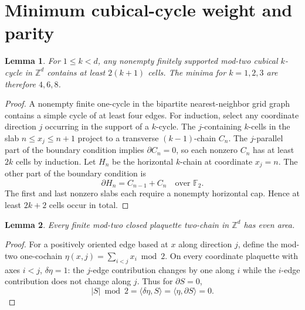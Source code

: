 \documentclass[11pt,a4paper]{article}
\newtheorem{lemma}{Lemma}
\begin{document}
\section{Minimum cubical-cycle weight and parity}
\begin{lemma}\label{lem:min}
For \(1\le k<d\), any nonempty finitely supported mod-two cubical \(k\)-cycle in \(\mathbb Z^d\) contains at least \(2(k+1)\) cells. The minima for \(k=1,2,3\) are therefore \(4,6,8\).
\end{lemma}
\begin{proof}
A nonempty finite one-cycle in the bipartite nearest-neighbor grid graph contains a simple cycle of at least four edges. For induction, select any coordinate direction \(j\) occurring in the support of a \(k\)-cycle. The \(j\)-containing \(k\)-cells in the slab \(n\le x_j\le n+1\) project to a transverse \((k-1)\)-chain \(C_n\). The \(j\)-parallel part of the boundary condition implies \(\partial C_n=0\), so each nonzero \(C_n\) has at least \(2k\) cells by induction. Let \(H_n\) be the horizontal \(k\)-chain at coordinate \(x_j=n\). The other part of the boundary condition is
\[
\partial H_n=C_{n-1}+C_n\quad\text{over }\mathbb F_2.
\]
The first and last nonzero slabs each require a nonempty horizontal cap. Hence at least \(2k+2\) cells occur in total.
\end{proof}
\begin{lemma}\label{lem:even}
Every finite mod-two closed plaquette two-chain in \(\mathbb Z^d\) has even area.
\end{lemma}
\begin{proof}
For a positively oriented edge based at \(x\) along direction \(j\), define the mod-two one-cochain
\(\eta(x,j)=\sum_{i<j}x_i\bmod2\).
On every coordinate plaquette with axes \(i<j\), \(\delta\eta=1\): the \(j\)-edge contribution changes by one along \(i\) while the \(i\)-edge contribution does not change along \(j\). Thus for \(\partial S=0\),
\[
|S|\bmod2=\langle\delta\eta,S\rangle
=\langle\eta,\partial S\rangle=0.
\]
\end{proof}
\end{document}
